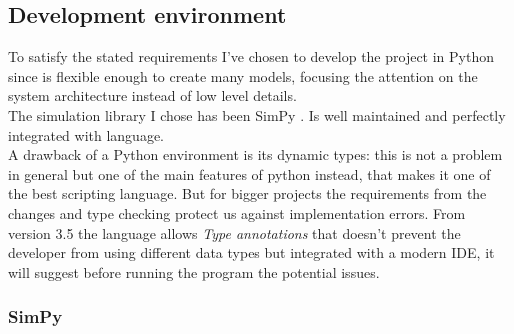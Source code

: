 \subsection{Development environment}
To satisfy the stated requirements I've chosen to develop the project in Python
since is flexible enough to create many models, focusing the attention on the
system architecture instead of low level details. \\
The simulation library I chose has been SimPy \cite{simpy}. Is well maintained
and perfectly integrated with language. \\
A drawback of a Python environment is its dynamic types: this is not a problem
in general but one of the main features of python instead, that makes it one of
the best scripting language. But for bigger projects the requirements from the
changes and type checking protect us against implementation errors. From version
3.5 the language allows \textit{Type annotations} that doesn't prevent the
developer from using different data types but integrated with a modern IDE, it
will suggest before running the program the potential issues.

\subsubsection*{SimPy}



